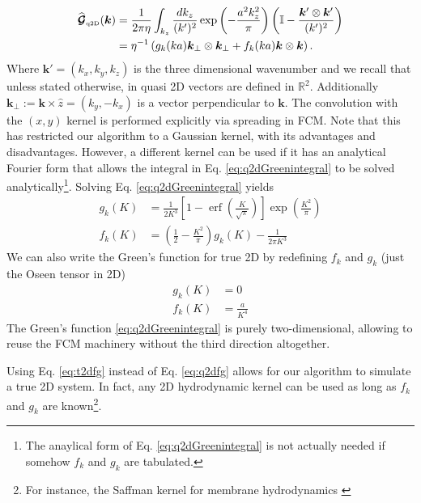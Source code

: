 \documentclass[twoside,openright,titlepage,numbers=noenddot,%
headinclude,footinclude,cleardoublepage=empty,abstract=on,
BCOR=5mm,fontsize=11pt, dvipsnames, paper=b5
]{scrreprt}
\renewcommand{\vec}[1]{\bm{#1}}
\newcommand{\tens}[1]{\bm{\mathcal{#1}}}
\newcommand{\fou}[1]{\widehat{#1}}
\DeclareMathOperator{\erf}{erf}
\newcommand{\qtd}{\text{\tiny q2D}}
\begin{document}
\begin{equation}
  \label{eq:q2dGreenintegral}
  \begin{aligned}
  \fou{\tens{G}}_{\qtd}(\vec{k}) &= \frac{1}{2\pi\eta}\int_{k_z} \frac{dk_z}{(k')^2}\exp\left(-\frac{a^2k_z^2}{\pi}\right)\left( \mathbb{I} - \frac{\vec{k}'\otimes\vec{k}'}{(k')^2}\right) \\
  &= \eta^{-1}\left(g_k(ka)\vec{k}_{\perp}\otimes\vec{k}_{\perp} + f_k(ka)\vec{k}\otimes\vec{k}\right).
\end{aligned}
\end{equation}
Where $\vec{k}' = (k_x, k_y, k_z)$ is the three dimensional wavenumber and we recall that unless stated otherwise, in quasi 2D vectors are defined in $\mathbb{R}^2$. Additionally $\vec{k}_\perp := \vec{k}\times\hat{z} = (k_y, -k_x)$ is a vector perpendicular to $\vec{k}$.
The convolution with the $(x,y)$ kernel is performed explicitly via spreading in \gls{FCM}.
Note that this has restricted our algorithm to a Gaussian kernel, with its advantages and disadvantages. However, a different kernel can be used if it has an analytical Fourier form that allows the integral in Eq. \eqref{eq:q2dGreenintegral} to be solved analytically\footnote{The anaylical form of Eq. \eqref{eq:q2dGreenintegral} is not actually needed if somehow $f_k$ and $g_k$ are tabulated.}.
Solving Eq. \eqref{eq:q2dGreenintegral} yields
\begin{equation}
  \label{eq:q2dfg}
  \begin{aligned}
    g_{k}\left(K\right) & = \frac{1}{2K^3}\left[1-{\erf}\left(\frac{K}{\sqrt{\pi}}\right)\right]\exp\left(\frac{K^2}{\pi}\right)\\
    f_{k}\left(K\right) & = \left(\frac{1}{2} - \frac{K^{2}}{\pi}\right)g_k(K) - \frac{1}{2\pi K^3}
  \end{aligned}  
\end{equation}
We can also write the Green's function for true 2D by redefining $f_k$ and $g_k$ (just the Oseen tensor in 2D)
\begin{equation}
  \label{eq:t2dfg}
  \begin{aligned}
    g_{k}\left(K\right) & = 0\\
    f_{k}\left(K\right) & = \frac{a}{K^4}
  \end{aligned}  
\end{equation}
The Green's function \eqref{eq:q2dGreenintegral} is purely two-dimensional, allowing to reuse the \gls{FCM} machinery without the third direction altogether.

Using Eq. \eqref{eq:t2dfg} instead of Eq. \eqref{eq:q2dfg} allows for our algorithm to simulate a true 2D system. In fact, any 2D hydrodynamic kernel can be used as long as $f_k$ and $g_k$ are known\footnote{For instance, the Saffman kernel for membrane hydrodynamics \cite{Brown20112.}}.
\end{document}
